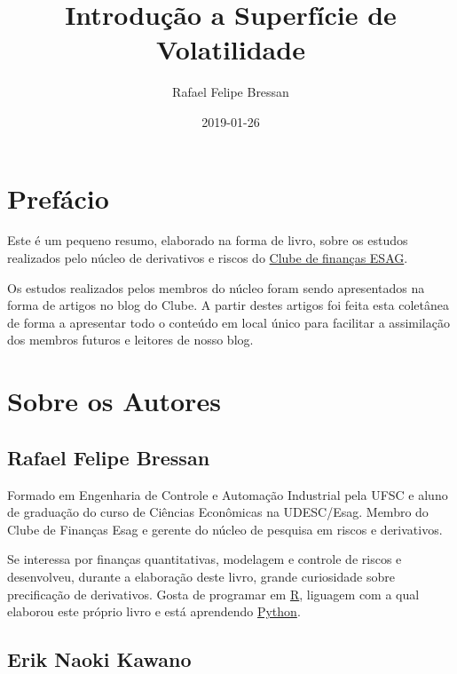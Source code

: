 \documentclass[]{book}
\title{Introdução a Superfície de Volatilidade}
\author{Rafael Felipe Bressan}
\date{2019-01-26}
\begin{document}
\maketitle

{
\setcounter{tocdepth}{1}
\tableofcontents
}
\chapter*{Prefácio}\label{prefacio}

Este é um pequeno resumo, elaborado na forma de livro, sobre os estudos
realizados pelo núcleo de derivativos e riscos do
\href{https://clubedefinancas.com.br}{Clube de finanças ESAG}.

Os estudos realizados pelos membros do núcleo foram sendo apresentados
na forma de artigos no blog do Clube. A partir destes artigos foi feita
esta coletânea de forma a apresentar todo o conteúdo em local único para
facilitar a assimilação dos membros futuros e leitores de nosso blog.

\chapter*{Sobre os Autores}\label{sobre-os-autores}

\section*{Rafael Felipe Bressan}\label{rafael-felipe-bressan}

Formado em Engenharia de Controle e Automação Industrial pela UFSC e
aluno de graduação do curso de Ciências Econômicas na UDESC/Esag. Membro
do Clube de Finanças Esag e gerente do núcleo de pesquisa em riscos e
derivativos.

Se interessa por finanças quantitativas, modelagem e controle de riscos
e desenvolveu, durante a elaboração deste livro, grande curiosidade
sobre precificação de derivativos. Gosta de programar em
\href{https://cran.r-project.org/}{R}, liguagem com a qual elaborou este
próprio livro e está aprendendo \href{https://www.python.org/}{Python}.

\section*{Erik Naoki Kawano}\label{erik-naoki-kawano}
\end{document}
